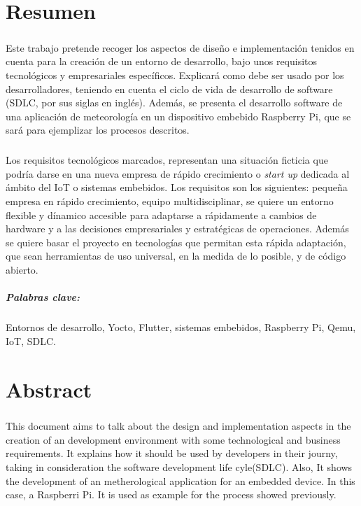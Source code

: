\chapter{Resumen}

\paragraph{}Este trabajo pretende recoger los aspectos de diseño e implementación
tenidos en cuenta para la creación de un entorno de desarrollo, bajo unos requisitos
tecnológicos y empresariales específicos. Explicará como debe ser usado por los
desarrolladores, teniendo en cuenta el ciclo de vida de desarrollo de software (SDLC,
por sus siglas en inglés). Además, se presenta el desarrollo software de una aplicación
de meteorología en un dispositivo embebido Raspberry Pi, que se sará para ejemplizar
los procesos descritos.

\paragraph{}Los requisitos tecnológicos marcados, representan una situación ficticia
que podría darse en una nueva empresa de rápido crecimiento o \textit{start up} dedicada
al ámbito del IoT o sistemas embebidos. Los requisitos son los siguientes:
pequeña empresa en rápido crecimiento, equipo multidisciplinar, se quiere un entorno
flexible y dínamico accesible para adaptarse a rápidamente a cambios de hardware y
a las decisiones empresariales y estratégicas de operaciones. Además se quiere basar
el proyecto en tecnologías que permitan esta rápida adaptación, que sean herramientas
de uso universal, en la medida de lo posible, y de código abierto.

\paragraph{Palabras clave:} Entornos de desarrollo, Yocto, Flutter, sistemas embebidos,
 Raspberry Pi, Qemu, IoT, SDLC.

\chapter{Abstract}

\paragraph{}This document aims to talk about the design and implementation aspects in
the creation of an development environment with some technological and business requirements.
It explains how it should be used by developers in their journy, taking in consideration
the software development life cyle(SDLC). Also, It shows the development of an
metherological application for an embedded device. In this case, a Raspberri Pi. It
is used as example for the process showed previously.

